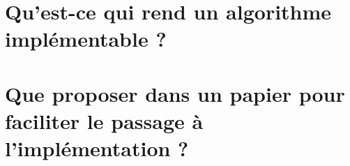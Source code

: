 \section{Qu'est-ce qui rend un algorithme implémentable ?}

\section{Que proposer dans un papier pour faciliter le passage à l'implémentation ?}

